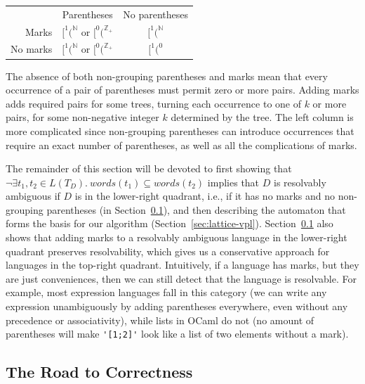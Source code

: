 \documentclass[runningheads]{llncs}
\newcommand{\words}{\mathit{words}} %
\newcommand{\reqpl}{(}
\newcommand{\pospl}{[}
\begin{document}
\begin{center}
\begin{tabular}{r@{\quad}c@{\quad}c}
  & Parentheses & No parentheses \\
  \addlinespace
  Marks & $\pospl^1\reqpl^{\mathbb{N}}$ or $\pospl^0\reqpl^{\mathbb{Z}_{+}}$ & $\pospl^1\reqpl^{\mathbb{N}}$ \\
  No marks & $\pospl^1\reqpl^{\mathbb{N}}$ or $\pospl^0\reqpl^{\mathbb{Z}_{+}}$ & $\pospl^1\reqpl^0$ \\
\end{tabular}
\end{center}

\noindent The absence of both non-grouping parentheses and marks mean that every occurrence of a pair of parentheses must permit zero or more pairs. Adding marks adds required pairs for some trees, turning each occurrence to one of $k$ or more pairs, for some non-negative integer $k$ determined by the tree. The left column is more complicated since non-grouping parentheses can introduce occurrences that require an exact number of parentheses, as well as all the complications of marks.

The remainder of this section will be devoted to first showing that $\neg \exists t_1, t_2 \in L(T_D).\ \words(t_1) \subseteq \words(t_2)$ implies that $D$ is resolvably ambiguous if $D$ is in the lower-right quadrant, i.e., if it has no marks and no non-grouping parentheses (in Section~\ref{sec:static-proofs}), and then describing the automaton that forms the basis for our algorithm (Section~\ref{sec:lattice-vpl}). Section~\ref{sec:static-proofs} also shows that adding marks to a resolvably ambiguous language in the lower-right quadrant preserves resolvability, which gives us a conservative approach for languages in the top-right quadrant. Intuitively, if a language has marks, but they are just conveniences, then we can still detect that the language is resolvable. For example, most expression languages fall in this category (we can write any expression unambiguously by adding parentheses everywhere, even without any precedence or associativity), while lists in OCaml do not (no amount of parentheses will make \verb|'[1;2]'| look like a list of two elements without a mark).

\subsection{The Road to Correctness} \label{sec:static-proofs} %
\end{document}
